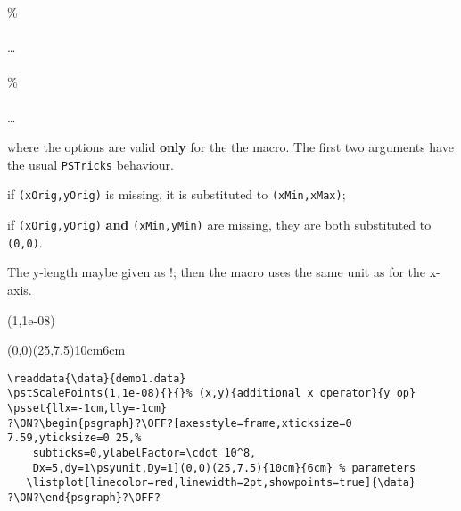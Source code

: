 \documentclass[11pt,english,BCOR10mm,DIV12,bibliography=totoc,parskip=false,smallheadings
    headexclude,footexclude,oneside,dvipsnames,svgnames]{pst-doc}
\begin{document}
\begin{BDef}
\OptArgs{}\%\\
\qquad{}\\
\ldots\\
\\[10pt]
\OptArgs{}\%\\
\qquad{}\\
\ldots\\
\end{BDef}

where the options are valid \textbf{only} for the the  macro. The first
two arguments have the usual \verb+PSTricks+ behaviour.
\begin{compactitem}
  \item if \verb+(xOrig,yOrig)+ is missing, it is substituted to  \verb+(xMin,xMax)+;
  \item if \verb+(xOrig,yOrig)+ \textbf{and} \verb+(xMin,yMin)+ are missing, they are both
  substituted to \verb+(0,0)+.
\end{compactitem}

The y-length maybe given as !; then the macro uses the same unit
as for the x-axis.

\begin{center}
\pstScalePoints(1,1e-08){}{}%
\begin{psgraph}[axesstyle=frame,xticksize=0 7.59,yticksize=0 25,%
    subticks=0,ylabelFactor=\cdot 10^8,
    Dx=5,dy=1\psyunit,Dy=1](0,0)(25,7.5){10cm}{6cm} %
   \listplot[linecolor=red,linewidth=2pt,showpoints=true]{\data}
\end{psgraph}
\end{center}

\begin{lstlisting}
\readdata{\data}{demo1.data}
\pstScalePoints(1,1e-08){}{}% (x,y){additional x operator}{y op}
\psset{llx=-1cm,lly=-1cm}
?\ON?\begin{psgraph}?\OFF?[axesstyle=frame,xticksize=0 7.59,yticksize=0 25,%
    subticks=0,ylabelFactor=\cdot 10^8,
    Dx=5,dy=1\psyunit,Dy=1](0,0)(25,7.5){10cm}{6cm} % parameters
   \listplot[linecolor=red,linewidth=2pt,showpoints=true]{\data}
?\ON?\end{psgraph}?\OFF?
\end{lstlisting}
\end{document}
